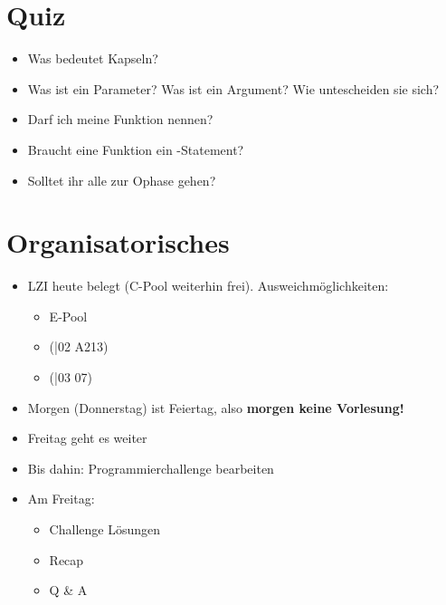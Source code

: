 \section{Quiz}
\begin{frame}
    \slidehead
    \begin{itemize}
        \item Was bedeutet Kapseln?
            \pause
        \item Was ist ein Parameter?
            Was ist ein Argument?
            Wie untescheiden sie sich?
            \pause
        \item Darf ich meine Funktion  nennen?
            \pause
        \item Braucht eine Funktion ein -Statement?
            \pause
        \item Solltet ihr alle zur Ophase gehen?
    \end{itemize}
\end{frame}

\section{Organisatorisches}
\begin{frame}[<+->]
    \slidehead
    \begin{itemize}
        \item LZI heute belegt (C-Pool weiterhin frei). Ausweichmöglichkeiten:\begin{itemize}
                \item E-Pool
                \item (\textbf{}|02 A213)
                \item (\textbf{}|03 07)
            \end{itemize}
        \item Morgen (Donnerstag) ist Feiertag, also \textbf{morgen keine Vorlesung!}
        \item Freitag geht es weiter
        \item Bis dahin: Programmierchallenge bearbeiten
        \item Am Freitag:\begin{itemize}
                \item Challenge Lösungen
                \item Recap
                \item Q \& A
            \end{itemize}
    \end{itemize}
\end{frame}
\begin{frame}
    \slidehead
\end{frame}

